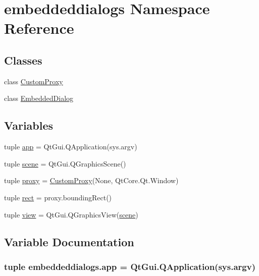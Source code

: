 \hypertarget{namespaceembeddeddialogs}{}\section{embeddeddialogs Namespace Reference}
\label{namespaceembeddeddialogs}
\subsection*{Classes}
\begin{DoxyCompactItemize}
\item 
class \hyperlink{classembeddeddialogs_1_1CustomProxy}{Custom\+Proxy}
\item 
class \hyperlink{classembeddeddialogs_1_1EmbeddedDialog}{Embedded\+Dialog}
\end{DoxyCompactItemize}
\subsection*{Variables}
\begin{DoxyCompactItemize}
\item 
tuple \hyperlink{namespaceembeddeddialogs_a8de8ed8a7fde05676f096e152e0338ea}{app} = Qt\+Gui.\+Q\+Application(sys.\+argv)
\item 
tuple \hyperlink{namespaceembeddeddialogs_ac100c4bc5a05073dfe885fbc7b556586}{scene} = Qt\+Gui.\+Q\+Graphics\+Scene()
\item 
tuple \hyperlink{namespaceembeddeddialogs_adec895560f5227adf32b6ba5383005f4}{proxy} = \hyperlink{classembeddeddialogs_1_1CustomProxy}{Custom\+Proxy}(None, Qt\+Core.\+Qt.\+Window)
\item 
tuple \hyperlink{namespaceembeddeddialogs_a5c6caf3719f1f0d3dc8321afd1c5945e}{rect} = proxy.\+bounding\+Rect()
\item 
tuple \hyperlink{namespaceembeddeddialogs_a91e0c5459cf6b9693b51e82f59c937be}{view} = Qt\+Gui.\+Q\+Graphics\+View(\hyperlink{namespaceembeddeddialogs_ac100c4bc5a05073dfe885fbc7b556586}{scene})
\end{DoxyCompactItemize}


\subsection{Variable Documentation}
\hypertarget{namespaceembeddeddialogs_a8de8ed8a7fde05676f096e152e0338ea}{}
\subsubsection[{app}]{\setlength{\rightskip}{0pt plus 5cm}tuple embeddeddialogs.\+app = Qt\+Gui.\+Q\+Application(sys.\+argv)}\label{namespaceembeddeddialogs_a8de8ed8a7fde05676f096e152e0338ea}
\hypertarget{namespaceembeddeddialogs_adec895560f5227adf32b6ba5383005f4}{}
